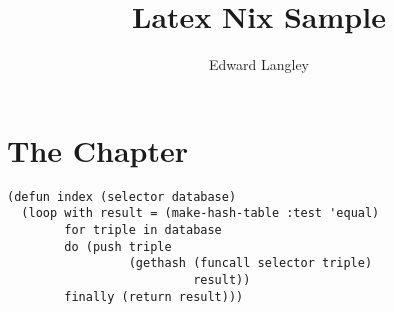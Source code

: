 \documentclass[12pt]{memoir}
\title{Latex Nix Sample}
\author{Edward Langley}
\begin{document}
\chapter{The Chapter}

\lipsum[1-4]

\begin{verbatim}
(defun index (selector database)
  (loop with result = (make-hash-table :test 'equal)
        for triple in database
        do (push triple
                 (gethash (funcall selector triple)
                          result))
        finally (return result)))
\end{verbatim}

\lipsum[6-9]
\end{document}
